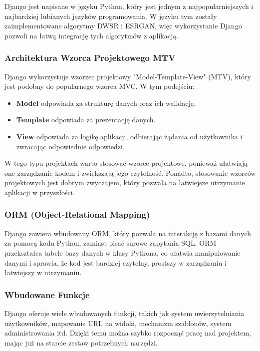 Django jest napisane w języku Python, który jest jednym z najpopularniejszych i najbardziej lubianych języków programowania. W języku tym zostały zaimplementowane algorytmy DWSR i ESRGAN, więc wykorzystanie Django pozwoli na łatwą integrację tych algorytmów z aplikacją.

\subsubsection*{Architektura Wzorca Projektowego MTV}

Django wykorzystuje wzorzec projektowy "Model-Template-View" (MTV), który jest podobny do popularnego wzorca MVC. W tym podejściu:
\begin{itemize}
    \item \textbf{Model} odpowiada za strukturę danych oraz ich walidację.
    \item \textbf{Template} odpowiada za prezentację danych.
    \item \textbf{View} odpowiada za logikę aplikacji, odbierając żądania od użytkownika i zwracając odpowiednie odpowiedzi.
\end{itemize}

W tego typu projektach warto stosować wzorce projektowe, ponieważ ułatwiają one zarządzanie kodem i zwiększają jego czytelność. Ponadto, stosowanie wzorców projektowych jest dobrym zwyczajem, który pozwala na łatwiejsze utrzymanie aplikacji w przyszłości.

\subsubsection*{ORM (Object-Relational Mapping)}

Django zawiera wbudowany ORM, który pozwala na interakcję z bazami danych za pomocą kodu Python, zamiast pisać surowe zapytania SQL. ORM przekształca tabele bazy danych w klasy Pythona, co ułatwia manipulowanie danymi i sprawia, że kod jest bardziej czytelny, prostszy w zarządzaniu i łatwiejszy w utrzymaniu.

\subsubsection*{Wbudowane Funkcje}

Django oferuje wiele wbudowanych funkcji, takich jak system uwierzytelniania użytkowników, mapowanie URL na widoki, mechanizm szablonów, system administrowania itd. Dzięki temu można szybko rozpocząć pracę nad projektem, mając już na starcie zestaw potrzebnych narzędzi.

